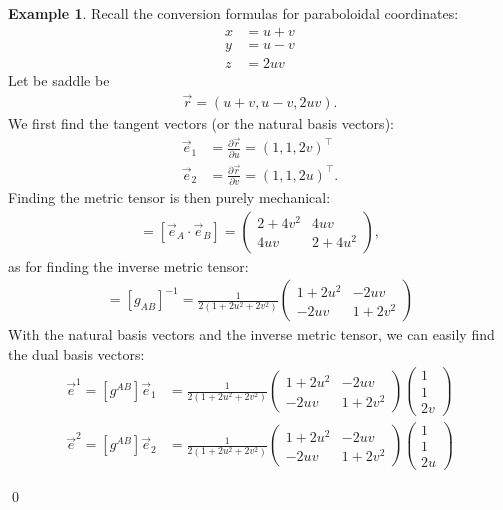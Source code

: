 \documentclass{book}
\theoremstyle{definition}
\newtheorem{exmp}{Example}[section]
\begin{document}
\begin{exmp}
	Recall the conversion formulas for paraboloidal coordinates:
	\begin{align*}
	x &= u+v\\
	y &= u-v\\
	z &= 2uv
	\end{align*}
	Let be saddle be
	\begin{align*}
	\vec{r} = (u+v, u-v, 2uv).
	\end{align*}
	We first find the tangent vectors (or the natural basis vectors):
	\begin{align*}
	\vec{e}_1 &= \frac{\partial \vec{r}}{\partial u} = (1,1,2v)^\top\\
	\vec{e}_2 &= \frac{\partial \vec{r}}{\partial v} = (1,1,2u)^\top.
	\end{align*}
	Finding the metric tensor is then purely mechanical:
	\begin{align*}
	[g_{AB}] = [\vec{e}_A\cdot\vec{e}_B] = 
	\begin{pmatrix}
	2 + 4v^2 & 4uv\\
	4uv & 2+4u^2
	\end{pmatrix},
	\end{align*}
	as for finding the inverse metric tensor:
	\begin{align*}
	[g^{AB}] = [g_{AB}]^{-1} = 
	\frac{1}{2(1+2u^2+2v^2)}
	\begin{pmatrix}
	1 + 2u^2 & -2uv\\
	-2uv & 1+2v^2
	\end{pmatrix}
	\end{align*}
	With the natural basis vectors and the inverse metric tensor, we can easily find the dual basis vectors:
	\begin{align*}
	\vec{e}^1 = [g^{AB}]\vec{e}_1 &= 
	\frac{1}{2(1+2u^2+2v^2)}
	\begin{pmatrix}
	1 + 2u^2 & -2uv\\
	-2uv & 1+2v^2
	\end{pmatrix}
	\begin{pmatrix}
	1 \\ 1 \\ 2v
	\end{pmatrix}\\
	\vec{e}^2 = [g^{AB}]\vec{e}_2 &= 
	\frac{1}{2(1+2u^2+2v^2)}
	\begin{pmatrix}
	1 + 2u^2 & -2uv\\
	-2uv & 1+2v^2
	\end{pmatrix}
	\begin{pmatrix}
	1 \\ 1 \\ 2u
	\end{pmatrix}
	\end{align*}
\end{exmp}\qed
\end{document}
